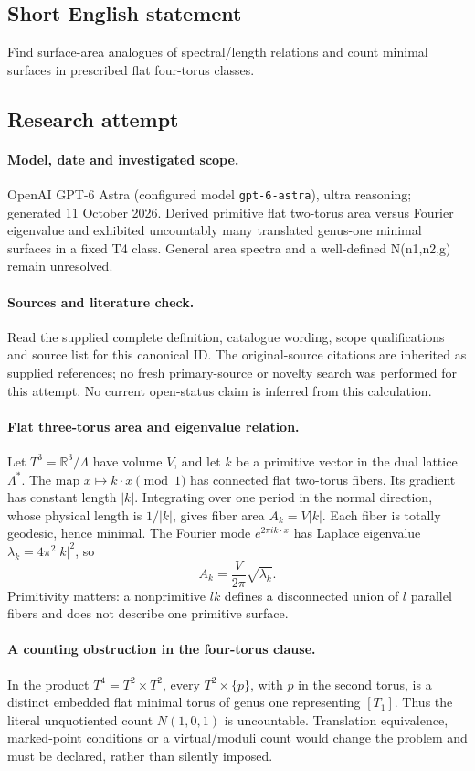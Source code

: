 \documentclass[11pt]{article}
\begin{document}
\subsection{Short English statement}
Find surface-area analogues of spectral/length relations and count minimal surfaces in prescribed flat four-torus classes.
\subsection{Research attempt}
\paragraph{Model, date and investigated scope.}
OpenAI GPT-6 Astra (configured model \texttt{gpt-6-astra}), ultra reasoning; generated 11 October 2026. Derived primitive flat two-torus area versus Fourier eigenvalue and exhibited uncountably many translated genus-one minimal surfaces in a fixed T4 class. General area spectra and a well-defined N(n1,n2,g) remain unresolved.

\paragraph{Sources and literature check.}
Read the supplied complete definition, catalogue wording, scope qualifications and source list for this canonical ID. The original-source citations are inherited as supplied references; no fresh primary-source or novelty search was performed for this attempt. No current open-status claim is inferred from this calculation.

\paragraph{Flat three-torus area and eigenvalue relation.}Let \(T^3=\mathbb R^3/\Lambda\) have volume \(V\), and let \(k\) be a primitive vector in the dual lattice \(\Lambda^*\). The map \(x\mapsto k\cdot x\pmod1\) has connected flat two-torus fibers. Its gradient has constant length \(|k|\). Integrating over one period in the normal direction, whose physical length is \(1/|k|\), gives fiber area \(A_k=V|k|\). Each fiber is totally geodesic, hence minimal. The Fourier mode \(e^{2\pi ik\cdot x}\) has Laplace eigenvalue \(\lambda_k=4\pi^2|k|^2\), so
\[A_k=\frac{V}{2\pi}\sqrt{\lambda_k}.
\]
Primitivity matters: a nonprimitive \(lk\) defines a disconnected union of \(l\) parallel fibers and does not describe one primitive surface.
\paragraph{A counting obstruction in the four-torus clause.}In the product \(T^4=T^2\times T^2\), every \(T^2\times\{p\}\), with \(p\) in the second torus, is a distinct embedded flat minimal torus of genus one representing \([T_1]\). Thus the literal unquotiented count \(N(1,0,1)\) is uncountable. Translation equivalence, marked-point conditions or a virtual/moduli count would change the problem and must be declared, rather than silently imposed.
\end{document}
